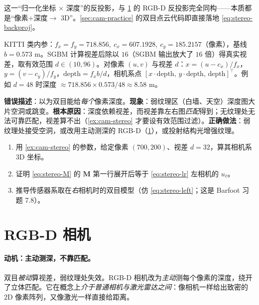 \noindent 这一“归一化坐标 $\times$ 深度”的反投影，与 \cref{sec:cam-rgbd} 的 RGB-D 反投影完全同构——本质都是“像素$+$深度$\to$ 3D”。\cref{sec:cam-practice} 的双目点云代码即直接落地 \cref{eq:stereo-backproj}。

\begin{example}[双目数值例]\label{ex:cam-stereo}
KITTI 类内参\cite{gaoxiang2019slam14}：$f_x=f_y=718.856,\ c_x=607.1928,\ c_y=185.2157$（像素），基线 $b=0.573$ m。SGBM 计算视差后除以 $16$（SGBM 输出放大了 $16$ 倍）得真实视差，取有效范围 $d\in(10,96)$。对像素 $(u,v)$ 与视差 $d$：$x=(u-c_x)/f_x$，$y=(v-c_y)/f_y$，$\text{depth}=f_x b/d$，相机系点 $[x\cdot\text{depth},\,y\cdot\text{depth},\,\text{depth}]^\top$。例如 $d=48$ 时深度 $\approx 718.856\times0.573/48\approx8.58$ m。
\end{example}

\begin{pitfall}
\textbf{错误描述}：以为双目能给\emph{每个}像素深度。\textbf{现象}：弱纹理区（白墙、天空）深度图大片空洞或跳变。\textbf{根本原因}：深度依赖视差，而视差靠左右图\emph{匹配}得到；无纹理处无法可靠匹配，视差算不出（\cref{ex:cam-stereo} 才要设有效范围过滤）。\textbf{正确做法}：弱纹理处接受空洞，或改用主动测深的 RGB-D（\cref{sec:cam-rgbd}），或投射结构光增强纹理。
\end{pitfall}

\begin{practice}
\begin{enumerate}
  \item 用 \cref{ex:cam-stereo} 的参数，给定像素 $(700,200)$、视差 $d=32$，算其相机系 3D 坐标。
  \item 证明 \cref{eq:stereo-M} 的 $\mathbf{M}$ 第一行展开后等于 \cref{eq:stereo-lr} 左相机的 $u_\ell$。
  \item 推导传感器系取在\emph{右}相机时的双目模型（仿 \cref{eq:stereo-left}；这是 Barfoot 习题 7.8\cite{barfoot2024state}）。
\end{enumerate}
\end{practice}

\section{RGB-D 相机}
\label{sec:cam-rgbd}

\paragraph{动机：主动测深，不靠匹配。}
双目\emph{被动}算视差，弱纹理处失效。RGB-D 相机改为\emph{主动}测每个像素的深度\cite{gaoxiang2019slam14}，绕开了立体匹配。它在概念上\emph{介于普通相机与激光雷达之间}\cite{carlone2026handbook}：像相机一样给出致密的 2D 像素阵列，又像激光一样直接给距离。

